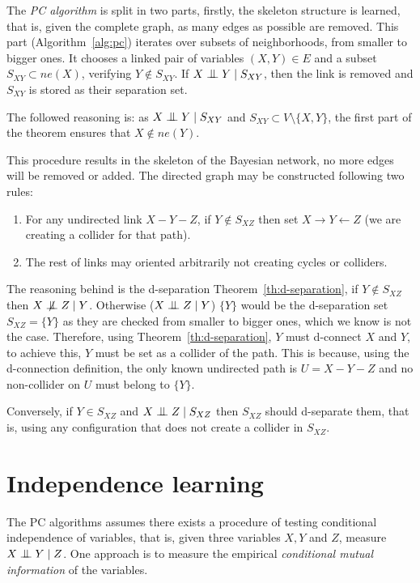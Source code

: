The \emph{PC algorithm} is split in two parts, firstly, the skeleton structure is learned, that is, given the complete graph, as many edges as possible are removed. This part (Algorithm~\ref{alg:pc}) iterates over subsets of neighborhoods, from smaller to bigger ones. It chooses a linked pair of variables \((X,Y) \in E\) and
a subset \(S_{XY} \subset ne(X)\), verifying \(Y \notin S_{XY}\). If \(X \bigCI Y \mid S_{XY}\), then the link is removed and \(S_{XY}\) is stored as their separation set.

The followed reasoning is: as \(X \bigCI Y \mid S_{XY}\) and \(S_{XY} \subset V \setminus \{X,Y\}\), the first part of the theorem ensures that \(X \notin ne(Y)\).

This procedure results in the skeleton of the Bayesian network, no more edges will be removed or added. The directed graph may be constructed following two rules:
\begin{enumerate}
  \item For any undirected link \(X - Y - Z\), if \(Y \notin S_{XZ}\) then set
    \(X \to Y \leftarrow Z\) (we are creating a collider for that path).
  \item The rest of links may oriented arbitrarily not
creating cycles or colliders.
\end{enumerate}
The reasoning behind is the d-separation Theorem~\ref{th:d-separation}, if \(Y \notin S_{XZ}\) then \(X \bigCD Z \mid Y\). Otherwise (\(X \bigCI Z \mid Y\)) \(\{Y\}\) would be the d-separation set \(S_{XZ} = \{Y\}\) as they are checked from smaller to bigger ones, which we know is not the case. Therefore, using Theorem~\ref{th:d-separation}, \(Y\) must d-connect \(X\) and \(Y\), to achieve this, \(Y\)  must be set as a collider of the path. This is because, using the d-connection definition, the only known undirected path is \(U = X - Y - Z\) and no non-collider on \(U\) must belong to \(\{Y\}\).

Conversely, if \(Y \in S_{XZ}\) and \(X \bigCI Z \mid S_{XZ}\) then \(S_{XZ}\) should d-separate them, that is, using any configuration that does not create a collider in \(S_{XZ}\).

\section{Independence learning}

The PC algorithms assumes there exists a procedure of testing conditional independence of variables, that is, given three variables \(X, Y\) and \( Z \),  measure \(X \bigCI Y \mid Z\). One approach is to measure the empirical \emph{conditional mutual information} of the variables.

